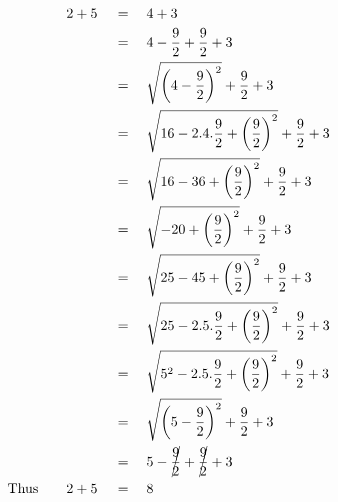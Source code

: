 \begin{align*}
2+5\quad&\,=\quad4+3\\
\,&\,=\quad4-\frac{9}{2}+\frac{9}{2}+3\\
\,&\,=\quad\sqrt{\left(4-\frac{9}{2}\right)^2}+\frac{9}{2}+3\\
\,&\,=\quad\sqrt{16-2.4.\frac{9}{2}+\left(\frac{9}{2}\right)^2}+\frac{9}{2}+3\\
\,&\,=\quad\sqrt{16-36+\left(\frac{9}{2}\right)^2}+\frac{9}{2}+3\\
\,&\,=\quad\sqrt{-20+\left(\frac{9}{2}\right)^2}+\frac{9}{2}+3\\
\,&\,=\quad\sqrt{25-45+\left(\frac{9}{2}\right)^2}+\frac{9}{2}+3\\
\,&\,=\quad\sqrt{25-2.5.\frac{9}{2}+\left(\frac{9}{2}\right)^2}+\frac{9}{2}+3\\
\,&\,=\quad\sqrt{5^2-2.5.\frac{9}{2}+\left(\frac{9}{2}\right)^2}+\frac{9}{2}+3\\
\,&\,=\quad\sqrt{\left(5-\frac{9}{2}\right)^2}+\frac{9}{2}+3\\
\,&\,=\quad5-\cancel{\frac{9}{2}}+\cancel{\frac{9}{2}}+3\\
\mathrm{Thus}\qquad2+5\quad&\,=\quad8
\end{align*}
